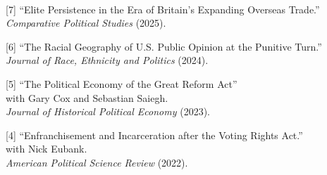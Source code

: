 \documentclass[11pt]{article}
\begin{document}
\vspace{.3in}
\begin{minipage}[t]{.21\textwidth}

	 \hspace*{.2in}  \\
\end{minipage}
\begin{minipage}[t]{.79\textwidth}

	[7] \hspace{.1in}  ``Elite Persistence in the Era of Britain's Expanding Overseas Trade.'' \\
	\hspace*{.3in} \emph{Comparative Political Studies} (2025). \\
  \vspace{-.05in}


	[6]\hspace{.1in} ``The Racial Geography of U.S. Public Opinion at the Punitive Turn.'' \\
	\hspace*{.3in} \emph{Journal of Race, Ethnicity and Politics} (2024).\\
	\vspace{-.05in}


	[5]\hspace{.1in} ``The Political Economy of the Great Reform Act'' \\
	\hspace*{.3in} with Gary Cox and Sebastian Saiegh. \\
	\hspace*{.3in} \emph{Journal of Historical Political Economy} (2023).\\
	\vspace{-.05in}

	[4]\hspace{.1in} ``Enfranchisement and Incarceration after the Voting Rights Act.'' \\
	\hspace*{.3in} with Nick Eubank.  \\
	\hspace*{.3in} \emph{American Political Science Review} (2022).\\
	\vspace{-.05in}




\end{minipage}
\end{document}
